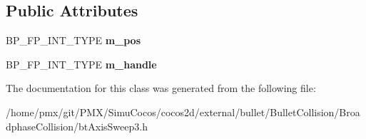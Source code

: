 \subsection*{Public Attributes}
\begin{DoxyCompactItemize}
\item 
\mbox{\label{classbtAxisSweep3Internal_1_1Edge_a9b0b2af45ac13557b01cac97d989871e}} 
B\+P\+\_\+\+F\+P\+\_\+\+I\+N\+T\+\_\+\+T\+Y\+PE {\bfseries m\+\_\+pos}
\item 
\mbox{\label{classbtAxisSweep3Internal_1_1Edge_a32417224d95d115bfee25315233d815e}} 
B\+P\+\_\+\+F\+P\+\_\+\+I\+N\+T\+\_\+\+T\+Y\+PE {\bfseries m\+\_\+handle}
\end{DoxyCompactItemize}


The documentation for this class was generated from the following file\+:\begin{DoxyCompactItemize}
\item 
/home/pmx/git/\+P\+M\+X/\+Simu\+Cocos/cocos2d/external/bullet/\+Bullet\+Collision/\+Broadphase\+Collision/bt\+Axis\+Sweep3.\+h\end{DoxyCompactItemize}
